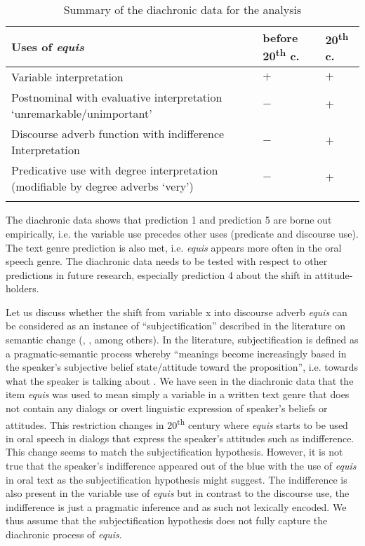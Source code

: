\documentclass[output=paper
,modfonts
,nonflat]{langsci/langscibook}
\begin{document}
\begin{table}\small
\caption{Summary of the diachronic data for the analysis}
\label{tab:4:Summary}
\setlength{\tabcolsep}{8pt}
 \begin{tabular}{p{4cm} p{2cm} p{2cm}}
  \lsptoprule
    Uses of \textit{equis} & \textbf{before 20}\textsuperscript{th} \textbf{c.} & \textbf{20}\textsuperscript{th} \textbf{c.}\\
  \toprule
   \raggedright Variable interpretation & $+$\cellcolor[gray]{0.5} & $+$\cellcolor[gray]{0.5}\\
  \midrule
   \raggedright Postnominal with evaluative interpretation ‘unremarkable/unimportant’ & $-$ & $+$\cellcolor[gray]{0.5}\\
  \midrule
   \raggedright Discourse adverb function with  indifference Interpretation & $-$ & $+$\cellcolor[gray]{0.5}\\
  \midrule
   \raggedright Predicative use with degree interpretation (modifiable by degree adverbs ‘very’) & $-$ & $+$\cellcolor[gray]{0.5}\\
  \lspbottomrule
 \end{tabular}
\end{table}

The diachronic data shows that prediction 1 and prediction 5 are borne out empirically, i.e. the variable use precedes other uses (predicate and discourse use). The text genre prediction is also met, i.e. \textit{equis} appears more often in the oral speech genre. The diachronic data needs to be tested with respect to other predictions in future research, especially prediction 4 about the shift in attitude-holders.

Let us discuss whether the shift from variable x into discourse adverb \textit{equis} can be considered as an instance of “subjectification” described in the literature on semantic change (\citealt{Traugott1995}, \citealt{Company2003}, among others). In the literature, subjectification is defined as a pragmatic-semantic process whereby “meanings become increasingly based in the speaker’s subjective belief state/attitude toward the proposition”, i.e. towards what the speaker is talking about \citep[31]{Traugott1995}. We have seen in the diachronic data that the item \textit{equis} was used to mean simply a variable in a written text genre that does not contain any dialogs or overt linguistic expression of speaker’s beliefs or attitudes. This restriction changes in 20\textsuperscript{th} century where \textit{equis} starts to be used in oral speech in dialogs that express the speaker’s attitudes such as indifference. This change seems to match the subjectification hypothesis. However, it is not true that the speaker’s indifference appeared out of the blue with the use of \textit{equis} in oral text as the subjectification hypothesis might suggest. The indifference is also present in the variable use of \textit{equis} but in contrast to the discourse use, the indifference is just a pragmatic inference and as such not lexically encoded. We thus assume that the subjectification hypothesis does not fully capture the diachronic process of \textit{equis}.
\end{document}
